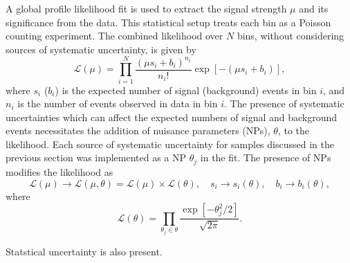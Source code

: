 

A global profile likelihood fit is used to extract the signal strength $\mu$ and its significance from the data. This statistical setup treats each bin as a Poisson counting experiment. The combined likelihood over $N$ bins, without considering sources of systematic uncertainty, is given by
%
\begin{equation}
    \mathcal{L}(\mu) = \prod_{i=1}^N \frac{(\mu s_i + b_i)^{n_i}}{n_i!} \exp \left[ - (\mu s_i + b_i) \right],
\end{equation}
%
where $s_i$ ($b_i$) is the expected number of signal (background) events in bin $i$, and $n_i$ is the number of events observed in data in bin $i$. The presence of systematic uncertainties which can affect the expected numbers of signal and background events necessitates the addition of nuisance parameters (NPs), $\theta$, to the likelihood. Each source of systematic uncertainty for \Vjets samples discussed in the previous section was implemented as a NP $\theta_j$ in the fit. The presence of NPs modifies the likelihood as 
%
\begin{equation}
    \mathcal{L}(\mu) \rightarrow \mathcal{L}(\mu, \theta) = \mathcal{L}(\mu) \times \mathcal{L}(\theta) , \quad s_i \rightarrow s_i(\theta) , \quad b_i \rightarrow b_i(\theta),
\end{equation}
%
where
%
\begin{equation}
    \mathcal{L}(\theta) = \prod_{\theta_j \in \theta} \frac{\exp\left[{-\theta_j^2/2}\right]}{\sqrt{2\pi}}.
\end{equation}
%


Statstical uncertainty is also present.


